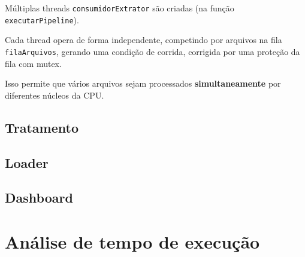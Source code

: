 \documentclass[a4paper,12pt]{article}
\begin{document}
Múltiplas threads \texttt{consumidorExtrator} são criadas (na função \texttt{executarPipeline}).

Cada thread opera de forma independente, competindo por arquivos na fila \texttt{filaArquivos}, gerando uma condição de corrida, corrigida por uma proteção da fila com mutex.
 
Isso permite que vários arquivos sejam processados \textbf{simultaneamente} por diferentes núcleos da CPU.

\subsection*{Tratamento}


\subsection*{Loader}


\subsection*{Dashboard}

\section{Análise de tempo de execução}
\end{document}
